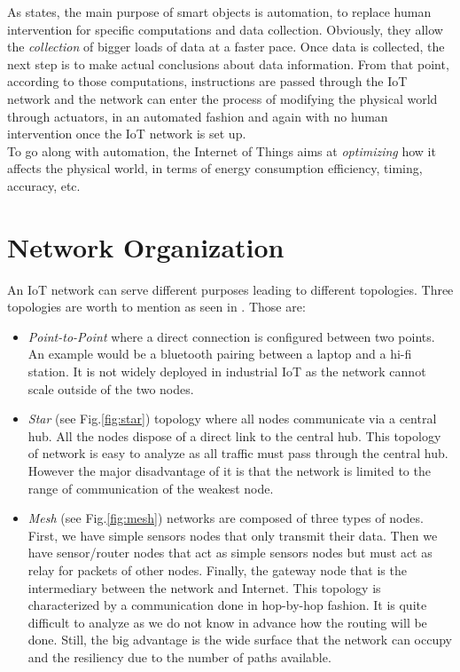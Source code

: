 As \cite{chui2010internet} states, the main purpose of smart objects is automation, to replace human intervention for specific computations and data collection. Obviously, they allow the \textit{collection} of bigger loads of data at a faster pace. Once data is collected, the next step is to make actual conclusions about data information. From that point, according to those computations, instructions are passed through the IoT network and the network can enter the process of modifying the physical world through actuators, in an automated fashion and again with no human intervention once the IoT network is set up.\\

To go along with automation, the Internet of Things aims at \textit{optimizing} how it affects the physical world, in terms of energy consumption efficiency, timing, accuracy, etc.

\section{Network Organization}

An IoT network can serve different purposes leading to different topologies. Three topologies are worth to mention as seen in \cite{website:3topo}. Those are:
\begin{itemize}
  \item \textit{Point-to-Point} where a direct connection is configured between two points. An example would be a bluetooth pairing between a laptop and a hi-fi station. It is not widely deployed in industrial IoT as the network cannot scale outside of the two nodes.
  \item \textit{Star} (see Fig.\ref{fig:star}) topology where all nodes communicate via a central hub. All the nodes dispose of a direct link to the central hub. This topology of network is easy to analyze as all traffic must pass through the central hub. However the major disadvantage of it is that the network is limited to the range of communication of the weakest node.
  \item \textit{Mesh} (see Fig.\ref{fig:mesh}) networks are composed of three types of nodes. First, we have simple sensors nodes that only transmit their data. Then we have sensor/router nodes that act as simple sensors nodes but must act as relay for packets of other nodes. Finally, the gateway node that is the intermediary between the network and Internet. This topology is characterized by a communication done in hop-by-hop fashion. It is quite difficult to analyze as we do not know in advance how the routing will be done. Still, the big advantage is the wide surface that the network can occupy and the resiliency due to the number of paths available.\\
\end{itemize}

